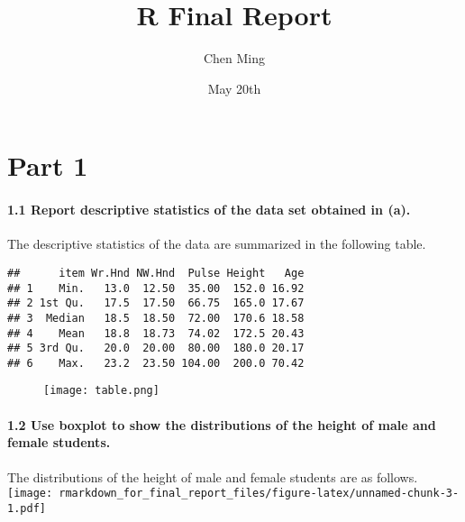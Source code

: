 \documentclass[]{article}
\title{R Final Report}
\author{Chen Ming}
\date{May 20th}
\let\oldparagraph\paragraph
\renewcommand{\paragraph}[1]{\oldparagraph{#1}\mbox{}}
\begin{document}
\maketitle

\hypertarget{part-1}{%
\section{Part 1}\label{part-1}}

\hypertarget{report-descriptive-statistics-of-the-data-set-obtained-in-a.}{%
\paragraph{\texorpdfstring{\textbf{1.1 Report descriptive statistics of
the data set obtained in (a).
}}{1.1 Report descriptive statistics of the data set obtained in (a). }}\label{report-descriptive-statistics-of-the-data-set-obtained-in-a.}}

The descriptive statistics of the data are summarized in the following
table.

\begin{verbatim}
##      item Wr.Hnd NW.Hnd  Pulse Height   Age
## 1    Min.   13.0  12.50  35.00  152.0 16.92
## 2 1st Qu.   17.5  17.50  66.75  165.0 17.67
## 3  Median   18.5  18.50  72.00  170.6 18.58
## 4    Mean   18.8  18.73  74.02  172.5 20.43
## 5 3rd Qu.   20.0  20.00  80.00  180.0 20.17
## 6    Max.   23.2  23.50 104.00  200.0 70.42
\end{verbatim}

\begin{figure}
\begin{center}
\texttt{[image: table.png]}
\end{center}
\end{figure}

\hypertarget{use-boxplot-to-show-the-distributions-of-the-height-of-male-and-female-students.}{%
\paragraph{\texorpdfstring{\textbf{1.2 Use boxplot to show the
distributions of the height of male and female
students.}}{1.2 Use boxplot to show the distributions of the height of male and female students.}}\label{use-boxplot-to-show-the-distributions-of-the-height-of-male-and-female-students.}}

The distributions of the height of male and female students are as
follows.
\texttt{[image: rmarkdown\_for\_final\_report\_files/figure-latex/unnamed-chunk-3-1.pdf]}
\end{document}
